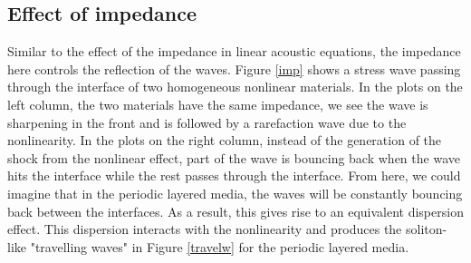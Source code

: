\documentclass{article}
\begin{document}
\subsection{Effect of impedance}
Similar to the effect of the impedance in linear acoustic equations, the impedance here controls the reflection of the waves. Figure \ref{imp} shows a stress wave passing through the interface of two homogeneous nonlinear materials. In the plots on the left column, the two materials have the same impedance, we see the wave is sharpening in the front and is followed by a rarefaction wave due to the nonlinearity. In the plots on the right column, instead of the generation of the shock from the nonlinear effect, part of the wave is bouncing back when the wave hits the interface while the rest passes through the interface. From here, we could imagine that in the periodic layered media, the waves will be constantly bouncing back between the interfaces. As a result, this gives rise to an equivalent dispersion effect. This dispersion interacts with the nonlinearity and produces the soliton-like "travelling waves" in Figure \ref{travelw} for the periodic layered media.
\end{document}
